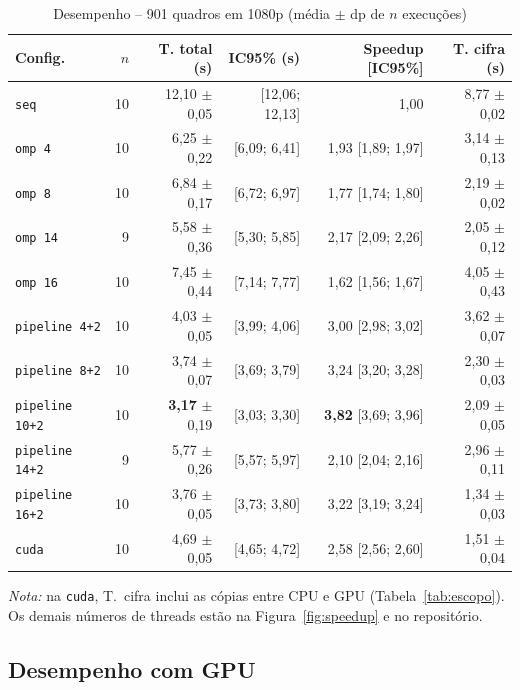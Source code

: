 \documentclass[12pt]{article}
\begin{document}
\begin{table}[ht]
\centering
\small
\caption{Desempenho -- 901 quadros em 1080p (média $\pm$ dp de $n$ execuções)}
\label{tab:desempenho}
\begin{tabular}{lrrrrr}
\hline
\textbf{Config.} & \textbf{$n$} & \textbf{T. total (s)} & \textbf{IC95\% (s)} &
\textbf{Speedup [IC95\%]} & \textbf{T. cifra (s)} \\
\hline
\texttt{seq}           & 10 & 12,10 $\pm$ 0,05 & [12,06; 12,13] & 1,00 & 8,77 $\pm$ 0,02 \\
\texttt{omp 4}         & 10 & 6,25 $\pm$ 0,22 & [6,09; 6,41] & 1,93 [1,89; 1,97] & 3,14 $\pm$ 0,13 \\
\texttt{omp 8}         & 10 & 6,84 $\pm$ 0,17 & [6,72; 6,97] & 1,77 [1,74; 1,80] & 2,19 $\pm$ 0,02 \\
\texttt{omp 14}        & 9  & 5,58 $\pm$ 0,36 & [5,30; 5,85] & 2,17 [2,09; 2,26] & 2,05 $\pm$ 0,12 \\
\texttt{omp 16}        & 10 & 7,45 $\pm$ 0,44 & [7,14; 7,77] & 1,62 [1,56; 1,67] & 4,05 $\pm$ 0,43 \\
\texttt{pipeline 4+2}  & 10 & 4,03 $\pm$ 0,05 & [3,99; 4,06] & 3,00 [2,98; 3,02] & 3,62 $\pm$ 0,07 \\
\texttt{pipeline 8+2}  & 10 & 3,74 $\pm$ 0,07 & [3,69; 3,79] & 3,24 [3,20; 3,28] & 2,30 $\pm$ 0,03 \\
\texttt{pipeline 10+2} & 10 & \textbf{3,17} $\pm$ 0,19 & [3,03; 3,30] & \textbf{3,82} [3,69; 3,96] & 2,09 $\pm$ 0,05 \\
\texttt{pipeline 14+2} & 9  & 5,77 $\pm$ 0,26 & [5,57; 5,97] & 2,10 [2,04; 2,16] & 2,96 $\pm$ 0,11 \\
\texttt{pipeline 16+2} & 10 & 3,76 $\pm$ 0,05 & [3,73; 3,80] & 3,22 [3,19; 3,24] & 1,34 $\pm$ 0,03 \\
\texttt{cuda}          & 10 & 4,69 $\pm$ 0,05 & [4,65; 4,72] & 2,58 [2,56; 2,60] & 1,51 $\pm$ 0,04 \\
\hline
\end{tabular}
\par\smallskip
{\footnotesize\textit{Nota:} na \texttt{cuda}, T.\ cifra inclui as cópias entre
CPU e GPU (Tabela~\ref{tab:escopo}). Os demais números de threads estão na
Figura~\ref{fig:speedup} e no repositório.}
\end{table}

\subsection{Desempenho com GPU}
\end{document}

